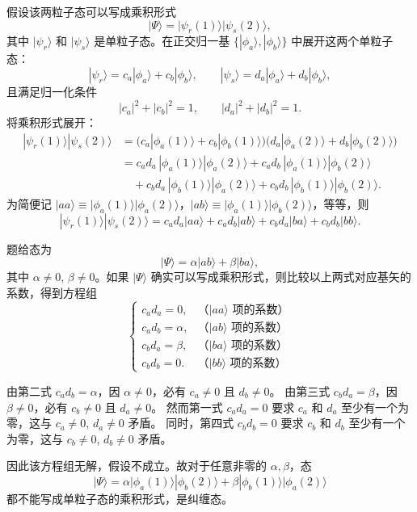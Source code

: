 \begin{solution}
假设该两粒子态可以写成乘积形式
\[
|\Psi\rangle=|\psi_r(1)\rangle|\psi_s(2)\rangle,
\]
其中 $|\psi_r\rangle$ 和 $|\psi_s\rangle$ 是单粒子态。在正交归一基 $\{|\phi_a\rangle,|\phi_b\rangle\}$ 中展开这两个单粒子态：
\[
|\psi_r\rangle=c_a|\phi_a\rangle+c_b|\phi_b\rangle,\qquad
|\psi_s\rangle=d_a|\phi_a\rangle+d_b|\phi_b\rangle,
\]
且满足归一化条件
\[
|c_a|^2+|c_b|^2=1,\qquad |d_a|^2+|d_b|^2=1.
\]
将乘积形式展开：
\[
\begin{aligned}
|\psi_r(1)\rangle|\psi_s(2)\rangle
&=\bigl(c_a|\phi_a(1)\rangle+c_b|\phi_b(1)\rangle\bigr)\bigl(d_a|\phi_a(2)\rangle+d_b|\phi_b(2)\rangle\bigr)\\[2mm]
&=c_a d_a\,|\phi_a(1)\rangle|\phi_a(2)\rangle
+ c_a d_b\,|\phi_a(1)\rangle|\phi_b(2)\rangle\\
&\quad + c_b d_a\,|\phi_b(1)\rangle|\phi_a(2)\rangle
+ c_b d_b\,|\phi_b(1)\rangle|\phi_b(2)\rangle.
\end{aligned}
\]
为简便记 $|aa\rangle\equiv|\phi_a(1)\rangle|\phi_a(2)\rangle$，$|ab\rangle\equiv|\phi_a(1)\rangle|\phi_b(2)\rangle$，等等，则
\[
|\psi_r(1)\rangle|\psi_s(2)\rangle
=c_a d_a|aa\rangle + c_a d_b|ab\rangle + c_b d_a|ba\rangle + c_b d_b|bb\rangle.
\]

题给态为
\[
|\Psi\rangle=\alpha|ab\rangle+\beta|ba\rangle,
\]
其中 $\alpha\neq0$, $\beta\neq0$。如果 $|\Psi\rangle$ 确实可以写成乘积形式，则比较以上两式对应基矢的系数，得到方程组
\[
\begin{cases}
c_a d_a = 0, & \text{（$|aa\rangle$ 项的系数）}\\[2pt]
c_a d_b = \alpha, & \text{（$|ab\rangle$ 项的系数）}\\[2pt]
c_b d_a = \beta, & \text{（$|ba\rangle$ 项的系数）}\\[2pt]
c_b d_b = 0. & \text{（$|bb\rangle$ 项的系数）}
\end{cases}
\]

由第二式 $c_a d_b = \alpha$，因 $\alpha\neq0$，必有 $c_a\neq0$ 且 $d_b\neq0$。
由第三式 $c_b d_a = \beta$，因 $\beta\neq0$，必有 $c_b\neq0$ 且 $d_a\neq0$。
然而第一式 $c_a d_a = 0$ 要求 $c_a$ 和 $d_a$ 至少有一个为零，这与 $c_a\neq0$, $d_a\neq0$ 矛盾。
同时，第四式 $c_b d_b = 0$ 要求 $c_b$ 和 $d_b$ 至少有一个为零，这与 $c_b\neq0$, $d_b\neq0$ 矛盾。

因此该方程组无解，假设不成立。故对于任意非零的 $\alpha,\beta$，态
\[
\boxed{|\Psi\rangle=\alpha|\phi_a(1)\rangle|\phi_b(2)\rangle+\beta|\phi_b(1)\rangle|\phi_a(2)\rangle}
\]
都不能写成单粒子态的乘积形式，是纠缠态。
\end{solution}

